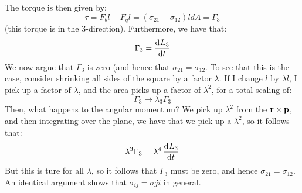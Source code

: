 \documentclass[../PHYS306Notes.tex]{subfiles}
\begin{document}
The torque is then given by:
\[\tau = F_b l - F_q l = (\sigma_{21} - \sigma_{12})ldA = \Gamma_3\]
(this torque is in the 3-direction). Furthermore, we have that:
\[\Gamma_3 = \dod{L_3}{t}\]
We now argue that $\Gamma_3$ is zero (and hence that $\sigma_{21} = \sigma_{12}$. To see that this is the case, consider shrinking all sides of the square by a factor $\lambda$. If I change $l$ by $\lambda l$, I pick up a factor of $\lambda$, and the area picks up a factor of $\lambda^2$, for a total scaling of:
\[\Gamma_3 \mapsto \lambda_3 \Gamma_3\]
Then, what happens to the angular momentum? We pick up $\lambda^2$ from the $\mathbf{r} \times \mathbf{p}$, and then integrating over the plane, we have that we pick up a $\lambda^2$, so it follows that:
\[\lambda^3\Gamma_3 = \lambda^4\dod{L_3}{t}\]
But this is ture for all $\lambda$, so it follows that $\Gamma_3$ must be zero, and hence $\sigma_{21} = \sigma_{12}$. An identical argument shows that $\sigma_{ij} = \sigma{ji}$ in general.
\end{document}
